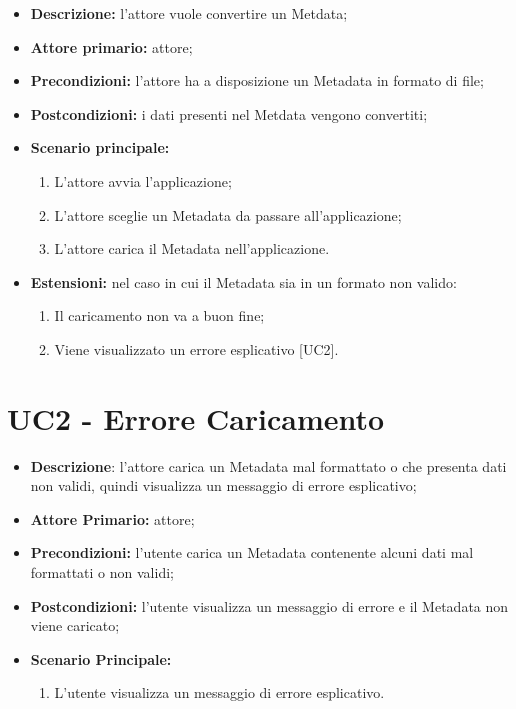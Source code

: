     \begin{itemize}
        \item \textbf{Descrizione:} l'attore vuole convertire un Metdata;
        \item \textbf{Attore primario:} attore;
        \item \textbf{Precondizioni:} l’attore ha a disposizione un Metadata in formato di file;
        \item \textbf{Postcondizioni:} i dati presenti nel Metdata vengono convertiti;
        \item \textbf{Scenario principale:}
        \begin{enumerate}
          \item L'attore avvia l'applicazione;
          \item L'attore sceglie un Metadata da passare all'applicazione;
          \item L'attore carica il Metadata nell'applicazione.
        \end{enumerate}
        \item \textbf{Estensioni:} nel caso in cui il Metadata sia in un formato non valido:
          \begin{enumerate}
            \item Il caricamento non va a buon fine;
            \item Viene visualizzato un errore esplicativo [UC2].
          \end{enumerate}
      \end{itemize}


    \section{UC2 - Errore Caricamento}
    \begin{itemize}
        \item \textbf{Descrizione}: l'attore carica un Metadata mal formattato o che presenta dati non validi, quindi visualizza un messaggio di errore esplicativo;
        \item \textbf{Attore Primario:} attore;
        \item \textbf{Precondizioni:} l’utente carica un Metadata contenente alcuni dati mal formattati o non validi;
        \item \textbf{Postcondizioni:} l'utente visualizza un messaggio di errore e il Metadata non viene caricato;
        \item \textbf{Scenario Principale:}
        \begin{enumerate}
          \item L'utente visualizza un messaggio di errore esplicativo.
        \end{enumerate}
      \end{itemize}

